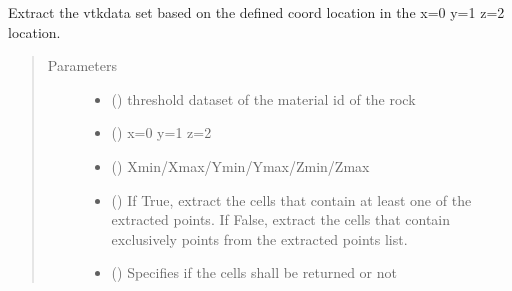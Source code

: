 \documentclass[letterpaper,10pt,english]{sphinxmanual}
\begin{document}
\begin{fulllineitems}
\begin{fulllineitems}
\begin{quote}
\begin{description}
\end{description}\end{quote}

\end{fulllineitems}


\begin{fulllineitems}
\label{\detokenize{openfdem:openfdem.openfdem.Model.extract_based_coord}}
Extract the vtkdata set based on the defined coord location in the x=0 y=1 z=2 location.
\begin{quote}\begin{description}
\item[{Parameters}] \leavevmode\begin{itemize}
\item {} 
 () \textendash{} threshold dataset of the material id of the rock

\item {} 
 () \textendash{} x=0 y=1 z=2

\item {} 
 () \textendash{} Xmin/Xmax/Ymin/Ymax/Zmin/Zmax

\item {} 
 () \textendash{} If True, extract the cells that contain at least one of the extracted points. If False, extract the cells that contain exclusively points from the extracted points list.

\item {} 
 () \textendash{} Specifies if the cells shall be returned or not


\end{itemize}
\end{description}
\end{quote}
\end{fulllineitems}
\end{fulllineitems}
\end{document}
